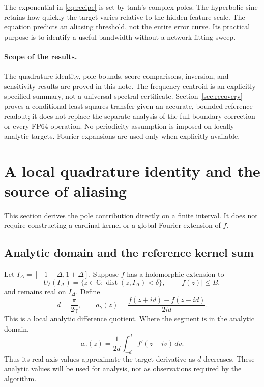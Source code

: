 \documentclass[11pt]{article}
\theoremstyle{definition}\newtheorem{definition}[theorem]{Definition}
\theoremstyle{remark}\newtheorem{remark}[theorem]{Remark}
\numberwithin{equation}{section}
\newcommand{\C}{\mathbb C}
\begin{document}
The exponential in \eqref{eq:recipe} is set by tanh's complex poles. The hyperbolic sine retains how quickly the target varies relative to the hidden-feature scale. The equation predicts an aliasing threshold, not the entire error curve. Its practical purpose is to identify a useful bandwidth without a network-fitting sweep.

\paragraph{Scope of the results.}
The quadrature identity, pole bounds, score comparisons, inversion, and sensitivity results are proved in this note. The frequency centroid is an explicitly specified summary, not a universal spectral certificate. Section~\ref{sec:recovery} proves a conditional least-squares transfer given an accurate, bounded reference readout; it does not replace the separate analysis of the full boundary correction or every FP64 operation. No periodicity assumption is imposed on locally analytic targets. Fourier expansions are used only when explicitly available.

\section{A local quadrature identity and the source of aliasing}
\label{sec:quadrature}
This section derives the pole contribution directly on a finite interval. It does not require constructing a cardinal kernel or a global Fourier extension of $f$.

\subsection{Analytic domain and the reference kernel sum}
Let $I_\Delta=[-1-\Delta,1+\Delta]$. Suppose $f$ has a holomorphic extension to
\[
 U_\delta(I_\Delta)=\{z\in\C:\operatorname{dist}(z,I_\Delta)<\delta\},
 \qquad |f(z)|\le B,
\]
and remains real on $I_\Delta$. Define
\begin{equation}
 d=\frac{\pi}{2\gamma},\qquad
 a_\gamma(z)=\frac{f(z+id)-f(z-id)}{2id}.
 \label{eq:density}
\end{equation}
This is a local analytic difference quotient. Where the segment is in the analytic domain,
\begin{equation}
 a_\gamma(z)=\frac1{2d}\int_{-d}^d f'(z+iv)\,dv.
 \label{eq:density-average}
\end{equation}
Thus its real-axis values approximate the target derivative as $d$ decreases. These analytic values will be used for analysis, not as observations required by the algorithm.
\end{document}

